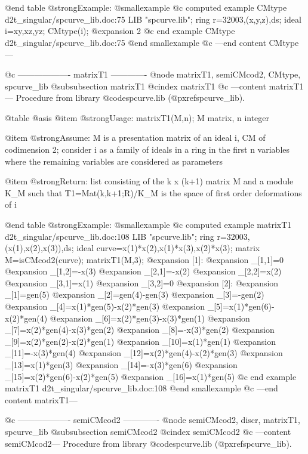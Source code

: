 @end table
@strong{Example:}
@smallexample
@c computed example CMtype d2t_singular/spcurve_lib.doc:75 
LIB "spcurve.lib";
ring r=32003,(x,y,z),ds;
ideal i=xy,xz,yz;
CMtype(i);
@expansion{} 2
@c end example CMtype d2t_singular/spcurve_lib.doc:75
@end smallexample
@c ---end content CMtype---

@c ------------------- matrixT1 -------------
@node matrixT1, semiCMcod2, CMtype, spcurve_lib
@subsubsection matrixT1
@cindex matrixT1
@c ---content matrixT1---
Procedure from library @code{spcurve.lib} (@pxref{spcurve_lib}).

@table @asis
@item @strong{Usage:}
matrixT1(M,n); M matrix, n integer

@item @strong{Assume:}
M is a presentation matrix of an ideal i, CM of codimension 2;
consider i as a family of ideals in a ring in the first n
variables where the remaining variables are considered as
parameters

@item @strong{Return:}
list consisting of the k x (k+1) matrix M and a module K_M such that
T1=Mat(k,k+1;R)/K_M is the space of first order deformations of i

@end table
@strong{Example:}
@smallexample
@c computed example matrixT1 d2t_singular/spcurve_lib.doc:108 
LIB "spcurve.lib";
ring r=32003,(x(1),x(2),x(3)),ds;
ideal curve=x(1)*x(2),x(1)*x(3),x(2)*x(3);
matrix M=isCMcod2(curve);
matrixT1(M,3);
@expansion{} [1]:
@expansion{}    _[1,1]=0
@expansion{}    _[1,2]=-x(3)
@expansion{}    _[2,1]=-x(2)
@expansion{}    _[2,2]=x(2)
@expansion{}    _[3,1]=x(1)
@expansion{}    _[3,2]=0
@expansion{} [2]:
@expansion{}    _[1]=gen(5)
@expansion{}    _[2]=gen(4)-gen(3)
@expansion{}    _[3]=-gen(2)
@expansion{}    _[4]=x(1)*gen(5)-x(2)*gen(3)
@expansion{}    _[5]=x(1)*gen(6)-x(2)*gen(4)
@expansion{}    _[6]=x(2)*gen(3)-x(3)*gen(1)
@expansion{}    _[7]=x(2)*gen(4)-x(3)*gen(2)
@expansion{}    _[8]=-x(3)*gen(2)
@expansion{}    _[9]=x(2)*gen(2)-x(2)*gen(1)
@expansion{}    _[10]=x(1)*gen(1)
@expansion{}    _[11]=-x(3)*gen(4)
@expansion{}    _[12]=x(2)*gen(4)-x(2)*gen(3)
@expansion{}    _[13]=x(1)*gen(3)
@expansion{}    _[14]=-x(3)*gen(6)
@expansion{}    _[15]=x(2)*gen(6)-x(2)*gen(5)
@expansion{}    _[16]=x(1)*gen(5)
@c end example matrixT1 d2t_singular/spcurve_lib.doc:108
@end smallexample
@c ---end content matrixT1---

@c ------------------- semiCMcod2 -------------
@node semiCMcod2, discr, matrixT1, spcurve_lib
@subsubsection semiCMcod2
@cindex semiCMcod2
@c ---content semiCMcod2---
Procedure from library @code{spcurve.lib} (@pxref{spcurve_lib}).

